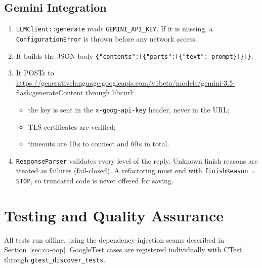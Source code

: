 \documentclass[12pt,a4paper,oneside]{book}
\begin{document}
\subsection{Gemini Integration}
\begin{enumerate}
  \item \texttt{LLMClient::\allowbreak{}generate} reads \texttt{GEMINI\_API\_KEY}. If it
    is missing, a \texttt{ConfigurationError} is thrown before any network
    access.
  \item It builds the JSON body
    \texttt{\{"contents":[\{"parts":[\{"text": prompt\}]\}]\}}.
  \item It POSTs to
    \url{https://generativelanguage.googleapis.com/v1beta/models/gemini-3.5-flash:generateContent}
    through libcurl:
    \begin{itemize}
      \item the key is sent in the \texttt{x-goog-api-key} header, never in
        the URL;
      \item TLS certificates are verified;
      \item timeouts are 10\,s to connect and 60\,s in total.
    \end{itemize}
  \item \texttt{ResponseParser} validates every level of the reply. Unknown
    finish reasons are treated as failures (fail-closed). A refactoring must
    end with \texttt{finishReason = STOP}, so truncated code is never offered
    for saving.
\end{enumerate}

\section{Testing and Quality Assurance}
\label{sec:ca-testing}

All tests run offline, using the dependency-injection seams described in
Section~\ref{sec:ca-oop}. GoogleTest cases are registered individually with
CTest through \texttt{gtest\_discover\_tests}.
\end{document}
